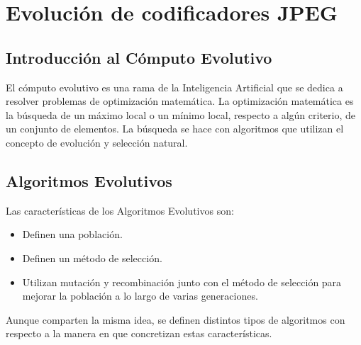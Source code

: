 
\chapter{Evolución de codificadores JPEG}\label{ch:evolucion}

\section{Introducción al Cómputo Evolutivo}

El \gls{cómputo evolutivo} es una rama de la Inteligencia Artificial que se
dedica a resolver problemas de optimización matemática. La optimización
matemática es la búsqueda de un máximo local o un mínimo local, respecto a
algún criterio, de un conjunto de elementos. La búsqueda se hace con
algoritmos que utilizan el concepto de evolución y selección natural.

\section{Algoritmos Evolutivos}

Las características de los Algoritmos Evolutivos son:

\begin{itemize}
   \item Definen una población.
   \item Definen un método de selección.
   \item Utilizan mutación y recombinación junto con el método de selección para
      mejorar la población a lo largo de varias generaciones.
\end{itemize}

Aunque comparten la misma idea, se definen distintos tipos de algoritmos con
respecto a la manera en que concretizan estas características.

